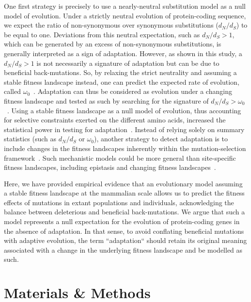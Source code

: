 \documentclass{article}
\newcommand{\dn}{d_N}
\newcommand{\ds}{d_S}
\newcommand{\dnds}{\dn / \ds}
\begin{document}
    One first strategy is precisely to use a nearly-neutral substitution model as a null model of evolution.
    Under a strictly neutral evolution of protein-coding sequence, we expect the ratio of non-synonymous over synonymous substitutions ($\dnds$) to be equal to one.
    Deviations from this neutral expectation, such as $\dnds > 1$, which can be generated by an excess of non-synonymous substitutions, is generally interpreted as a sign of adaptation.
    However, as shown in this study, a $\dnds > 1$ is not necessarily a signature of adaptation but can be due to beneficial back-mutations.
    So, by relaxing the strict neutrality and assuming a stable fitness landscape instead, one can predict the expected rate of evolution, called $\omega_0$~\cite{spielman_relationship_2015, dosreis_how_2015}.
    Adaptation can thus be considered as evolution under a changing fitness landscape and tested as such by searching for the signature of $\dnds > \omega_0$~\cite{cvijovic_fate_2015, rodrigue_detecting_2017, rodrigue_bayesian_2021}.
    Using a stable fitness landscape as a null model of evolution, thus accounting for selective constraints exerted on the different amino acids, increased the statistical power in testing for adaptation~\cite{latrille_genes_2023}.
    Instead of relying solely on summary statistics (such as $\dnds$ or $\omega_0$), another strategy to detect adaptation is to include changes in the fitness landscapes inherently within the mutation-selection framework~\cite{tamuri_mutationselection_2021}.
    Such mechanistic models could be more general than site-specific fitness landscapes, including epistasis and changing fitness landscapes~\cite{goldstein_sequence_2017, stolyarova_senescence_2020}.

    Here, we have provided empirical evidence that an evolutionary model assuming a stable fitness landscape at the mammalian scale allows us to predict the fitness effects of mutations in extant populations and individuals, acknowledging the balance between deleterious and beneficial back-mutations.
    We argue that such a model represents a null expectation for the evolution of protein-coding genes in the absence of adaptation.
    In that sense, to avoid conflating beneficial mutations with adaptive evolution, the term ``adaptation`` should retain its original meaning associated with a change in the underlying fitness landscape and be modelled as such.

    \section{Materials \& Methods}
    \label{sec:methods}
\end{document}
